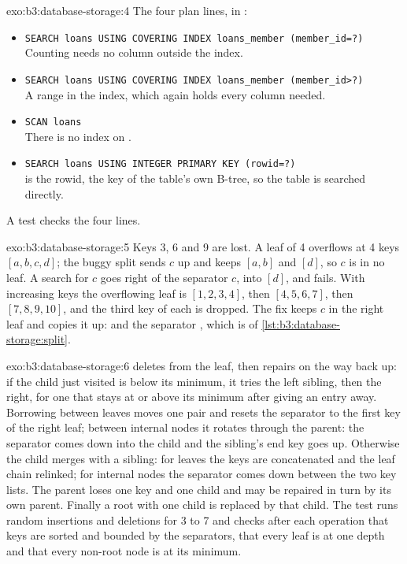 \begin{solution}{exo:b3:database-storage:4}
The four plan lines, in :
\begin{itemize}
  \item \texttt{SEARCH loans USING COVERING INDEX loans\_member (member\_id=?)}\\ Counting needs no column outside the index.
  \item \texttt{SEARCH loans USING COVERING INDEX loans\_member (member\_id>?)}\\ A range in the index, which again holds every column needed.
  \item \texttt{SCAN loans}\\ There is no index on .
  \item \texttt{SEARCH loans USING INTEGER PRIMARY KEY (rowid=?)}\\  is the rowid, the key of the table's own B-tree, so the table is searched directly.
\end{itemize}
A test checks the four lines.
\end{solution}

\begin{solution}{exo:b3:database-storage:5}
Keys 3, 6 and 9 are lost. A leaf of  4 overflows at 4 keys $[a, b, c, d]$; the buggy split sends $c$ up and keeps $[a, b]$ and $[d]$, so $c$ is in no leaf. A search for $c$ goes right of the separator $c$, into $[d]$, and fails. With increasing keys the overflowing leaf is $[1, 2, 3, 4]$, then $[4, 5, 6, 7]$, then $[7, 8, 9, 10]$, and the third key of each is dropped. The fix keeps $c$ in the right leaf and copies it up:  and the separator , which is  of \cref{lst:b3:database-storage:split}.
\end{solution}

\begin{solution}{exo:b3:database-storage:6}
 deletes from the leaf, then repairs on the way back up: if the child just visited is below its minimum, it tries the left sibling, then the right, for one that stays at or above its minimum after giving an entry away. Borrowing between leaves moves one pair and resets the separator to the first key of the right leaf; between internal nodes it rotates through the parent: the separator comes down into the child and the sibling's end key goes up. Otherwise the child merges with a sibling: for leaves the keys are concatenated and the leaf chain relinked; for internal nodes the separator comes down between the two key lists. The parent loses one key and one child and may be repaired in turn by its own parent. Finally a root with one child is replaced by that child. The test runs random insertions and deletions for  3 to 7 and checks after each operation that keys are sorted and bounded by the separators, that every leaf is at one depth and that every non-root node is at its minimum.
\end{solution}

